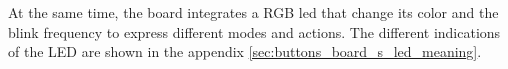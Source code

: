 	At the same time, the board integrates a RGB led that change its color and the blink frequency to express different modes and actions.
	The different indications of the LED are shown in the appendix \ref{sec:buttons_board_s_led_meaning}.


